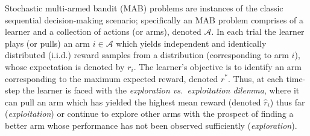 Stochastic multi-armed bandit (MAB) problems are instances of the classic sequential decision-making scenario; specifically an MAB problem comprises of a learner and a collection of actions (or arms), denoted $\mathcal{A}$. In each trial the learner plays (or pulls) an arm $i\in\mathcal{A}$ which yields independent and identically distributed (i.i.d.) reward samples from a distribution (corresponding to arm $i$), whose expectation is denoted by $r_i$. 
The learner's objective is to identify an arm corresponding to the maximum expected reward, denoted $r^{*}$. Thus, at each time-step the learner 
is faced with the \emph{exploration vs.\ exploitation dilemma}, where it can pull an arm which has yielded the highest mean reward (denoted $\hat{r}_{i}$) thus far (\emph{exploitation}) or continue to explore other arms with the prospect of finding a better arm 
whose performance has not been observed sufficiently (\emph{exploration}).


%
%

